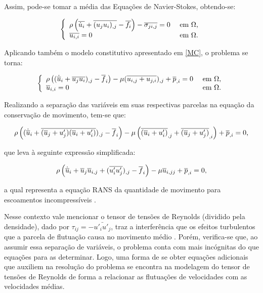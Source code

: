 Assim, pode-se tomar a média das Equações de Navier-Stokes, obtendo-se:

\begin{equation}
    \left\{
    \begin{array}{ll}
        \rho\left({\overline{\dot{u}_i}+\overline{(u_ju_i)_{,j}}-\overline{f_i}}\right)-\overline{\sigma_{ji,j}}=0 & \text{ em }\Omega\text{,} \\
        \overline{u_{i,i}}=0                                                                  & \text{ em }\Omega\text{.}
    \end{array}
    \right.
\end{equation}

Aplicando também o modelo constitutivo apresentado em \ref{MC}, o problema se torna:

\begin{equation}
    \left\{
    \begin{array}{ll}
        \rho\left({(\dot{\overline{u}}_i+\overline{u_ju_i})_{,j}-\overline{f}_i}\right)-\mu(\overline{u_{i,j}+u_{j,i}})_{,j}+\overline{p}_{,i}=0 & \text{ em }\Omega\text{,} \\
        \overline{u}_{i,i}=0                                                                                           & \text{ em }\Omega\text{.}
    \end{array}
    \right.
\end{equation}

Realizando a separação das variáveis em suas respectivas parcelas na equação da conservação de movimento, tem-se que:

\begin{equation}
    \rho\left({(\dot{\overline{u}}_i+\overline{(\overline{u}_j+u'_j)(\overline{u}_i+u'_i)})_{,j}-\overline{f}_i}\right)-\mu\left({\overline{(\overline{u}_i+u'_i)}_{,j}+\overline{(\overline{u}_j+u'_j)}_{,i}}\right)+\overline{p}_{,i}=0\text{,}
\end{equation}

\noindent que leva à seguinte expressão simplificada:

\begin{equation}
    \rho\left({\dot{\overline{u}}_i+\overline{u}_j\overline{u}_{i,j}+(\overline{u'_iu'_j})_{,j}-\overline{f}_i}\right)-\mu\overline{u}_{i,jj}+\overline{p}_{,i}=0\text{,}
    \label{eq:RANS-estac}
\end{equation}

\noindent a qual representa a equação RANS da quantidade de movimento para escoamentos incompressíveis \cite{chou1945velocity,alfonsi2009reynolds}.

Nesse contexto vale mencionar o tensor de tensões de Reynolds (dividido pela densidade), dado por $\tau_{ij}=-\bar{u'_iu'_j}$, traz a interferência que os efeitos turbulentos que a parcela de flutuação causa no movimento médio \cite{chou1945velocity,alfonsi2009reynolds}. Porém, verifica-se que, ao assumir essa separação de variáveis, o problema conta com mais incógnitas do que equações para as determinar. Logo, uma forma de se obter equações adicionais que auxiliem na resolução do problema se encontra na modelagem do tensor de tensões de Reynolds de forma a relacionar as flutuações de velocidades com as velocidades médias.

